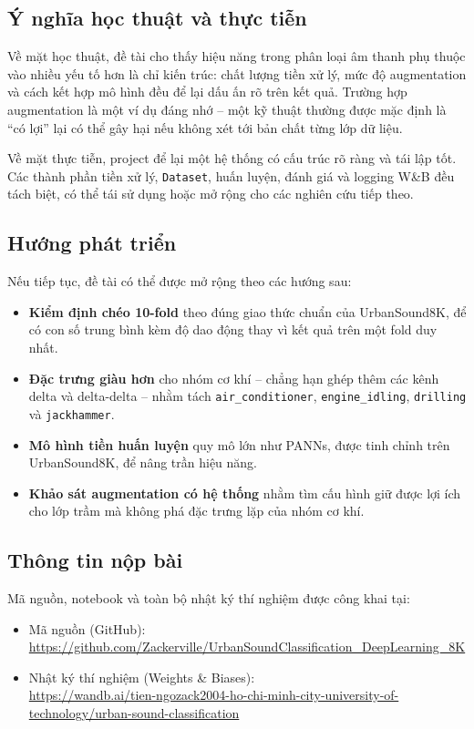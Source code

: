 \subsection{Ý nghĩa học thuật và thực tiễn}

Về mặt học thuật, đề tài cho thấy hiệu năng trong phân loại âm thanh phụ thuộc
vào nhiều yếu tố hơn là chỉ kiến trúc: chất lượng tiền xử lý, mức độ augmentation
và cách kết hợp mô hình đều để lại dấu ấn rõ trên kết quả. Trường hợp augmentation
là một ví dụ đáng nhớ -- một kỹ thuật thường được mặc định là ``có lợi'' lại có
thể gây hại nếu không xét tới bản chất từng lớp dữ liệu.

Về mặt thực tiễn, project để lại một hệ thống có cấu trúc rõ ràng và tái lập tốt.
Các thành phần tiền xử lý, \texttt{Dataset}, huấn luyện, đánh giá và logging W\&B
đều tách biệt, có thể tái sử dụng hoặc mở rộng cho các nghiên cứu tiếp theo.

\subsection{Hướng phát triển}

Nếu tiếp tục, đề tài có thể được mở rộng theo các hướng sau:

\begin{itemize}[leftmargin=1.4em,itemsep=2pt]
  \item \textbf{Kiểm định chéo 10-fold} theo đúng giao thức chuẩn của
        UrbanSound8K, để có con số trung bình kèm độ dao động thay vì kết quả
        trên một fold duy nhất.
  \item \textbf{Đặc trưng giàu hơn} cho nhóm cơ khí -- chẳng hạn ghép thêm các
        kênh delta và delta-delta -- nhằm tách \texttt{air\_conditioner},
        \texttt{engine\_idling}, \texttt{drilling} và \texttt{jackhammer}.
  \item \textbf{Mô hình tiền huấn luyện} quy mô lớn như PANNs, được tinh chỉnh
        trên UrbanSound8K, để nâng trần hiệu năng.
  \item \textbf{Khảo sát augmentation có hệ thống} nhằm tìm cấu hình giữ được
        lợi ích cho lớp trầm mà không phá đặc trưng lặp của nhóm cơ khí.
\end{itemize}

\subsection{Thông tin nộp bài}

Mã nguồn, notebook và toàn bộ nhật ký thí nghiệm được công khai tại:

\begin{itemize}[leftmargin=1.4em,itemsep=1pt]
  \item Mã nguồn (GitHub): \\
        \url{https://github.com/Zackerville/UrbanSoundClassification_DeepLearning_8K}
  \item Nhật ký thí nghiệm (Weights \& Biases): \\
        \url{https://wandb.ai/tien-ngozack2004-ho-chi-minh-city-university-of-technology/urban-sound-classification}
\end{itemize}
